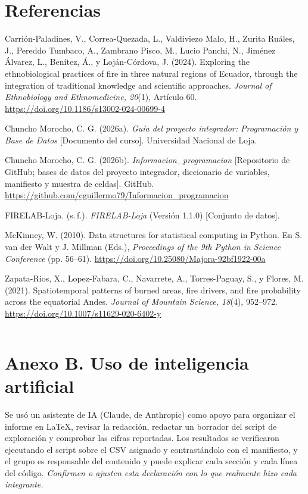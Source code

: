 \documentclass[11pt,a4paper]{article}
\newcommand{\completar}[1]{\textit{\textcolor{gris}{#1}}}
\newenvironment{refsapa}{\begin{list}{}{\setlength{\leftmargin}{1.27cm}\setlength{\itemindent}{-1.27cm}\setlength{\itemsep}{6pt}\setlength{\topsep}{0pt}\setlength{\parsep}{0pt}}\raggedright}{\end{list}}
\begin{document}
\section*{Referencias}
\begin{refsapa}
\item Carrión-Paladines, V., Correa-Quezada, L., Valdiviezo Malo, H., Zurita Ruáles, J., Pereddo Tumbaco, A., Zambrano Pisco, M., Lucio Panchi, N., Jiménez Álvarez, L., Benítez, Á., y Loján-Córdova, J. (2024). Exploring the ethnobiological practices of fire in three natural regions of Ecuador, through the integration of traditional knowledge and scientific approaches. \textit{Journal of Ethnobiology and Ethnomedicine, 20}(1), Artículo 60. \url{https://doi.org/10.1186/s13002-024-00699-4}
\item Chuncho Morocho, C. G. (2026a). \textit{Guía del proyecto integrador: Programación y Base de Datos} [Documento del curso]. Universidad Nacional de Loja.
\item Chuncho Morocho, C. G. (2026b). \textit{Informacion\_programacion} [Repositorio de GitHub; bases de datos del proyecto integrador, diccionario de variables, manifiesto y muestra de celdas]. GitHub. \url{https://github.com/cguillermo79/Informacion_programacion}
\item FIRELAB-Loja. (s.\,f.). \textit{FIRELAB-Loja} (Versión 1.1.0) [Conjunto de datos].
\item McKinney, W. (2010). Data structures for statistical computing in Python. En S. van der Walt y J. Millman (Eds.), \textit{Proceedings of the 9th Python in Science Conference} (pp. 56--61). \url{https://doi.org/10.25080/Majora-92bf1922-00a}
\item Zapata-Rios, X., Lopez-Fabara, C., Navarrete, A., Torres-Paguay, S., y Flores, M. (2021). Spatiotemporal patterns of burned areas, fire drivers, and fire probability across the equatorial Andes. \textit{Journal of Mountain Science, 18}(4), 952--972. \url{https://doi.org/10.1007/s11629-020-6402-y}
\end{refsapa}
\begin{lstlisting}[language=Python]
\end{lstlisting}
\section*{Anexo B. Uso de inteligencia artificial}
Se usó un asistente de IA (Claude, de Anthropic) como apoyo para organizar el informe en LaTeX, revisar la redacción, redactar un borrador del script de exploración y comprobar las cifras reportadas. Los resultados se verificaron ejecutando el script sobre el CSV asignado y contrastándolo con el manifiesto, y el grupo es responsable del contenido y puede explicar cada sección y cada línea del código. \completar{Confirmen o ajusten esta declaración con lo que realmente hizo cada integrante.}
\end{document}
